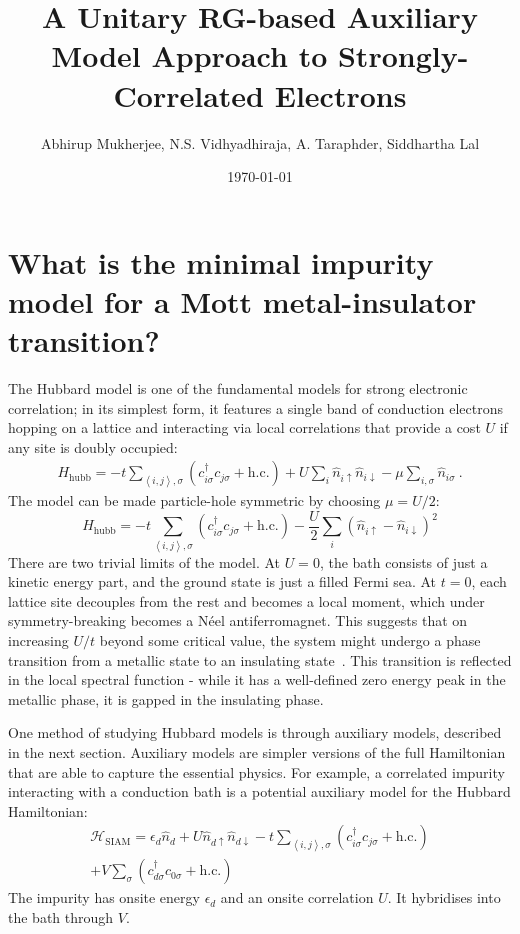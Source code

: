 \documentclass[reprint,hidelinks]{revtex4-2}
\begin{document}
\title{\bf A Unitary RG-based Auxiliary Model Approach to Strongly-Correlated Electrons}
\author{Abhirup Mukherjee, N.S. Vidhyadhiraja, A. Taraphder, Siddhartha Lal}
\date{\today}
\maketitle
\tableofcontents

\section{What is the minimal impurity model for a Mott metal-insulator transition?}
The Hubbard model is one of the fundamental models for strong electronic correlation; in its simplest form, it features a single band of conduction electrons hopping on a lattice and interacting via local correlations that provide a cost \(U\) if any site is doubly occupied:
\begin{equation}\begin{aligned}
	H_\text{hubb} = -t\sum_{\left<i,j \right>,\sigma}\left(c^\dagger_{i\sigma}c_{j\sigma}+\text{h.c.}\right) + U\sum_i \hat n_{i \uparrow} \hat n_{i \downarrow} - \mu \sum_{i,\sigma}\hat n_{i\sigma}~.
\end{aligned}\end{equation}
The model can be made particle-hole symmetric by choosing \(\mu = U/2\):
\[H_\text{hubb} = -t\sum_{\left<i,j \right>,\sigma}\left(c^\dagger_{i\sigma}c_{j\sigma}+\text{h.c.}\right) - \frac{U}{2}\sum_i \left(\hat n_{i \uparrow} - \hat n_{i \downarrow}\right)^2\]
There are two trivial limits of the model. At \(U=0\), the bath consists of just a kinetic energy part, and the ground state is just a filled Fermi sea. At \(t=0\), each lattice site decouples from the rest and becomes a local moment, which under symmetry-breaking becomes a Néel antiferromagnet. This suggests that on increasing \(U/t\) beyond some critical value, the system might undergo a phase transition from a metallic state to an insulating state~\cite{Mott_1949}. This transition is reflected in the local spectral function - while it has a well-defined zero energy peak in the metallic phase, it is gapped in the insulating phase.

One method of studying Hubbard models is through auxiliary models, described in the next section. Auxiliary models are simpler versions of the full Hamiltonian that are able to capture the essential physics. For example, a correlated impurity interacting with a conduction bath is a potential auxiliary model for the Hubbard Hamiltonian:
\begin{equation}\begin{aligned}
\label{clus_bath_siam}
\mathcal{H}_\text{SIAM} = \epsilon_d \hat n_d + U \hat n_{d \uparrow} \hat n_{d \downarrow} - t\sum_{\left<i,j \right>, \sigma}\left(c^\dagger_{i\sigma}c_{j\sigma} + \text{h.c.}\right) \\
+ V\sum_\sigma \left( c^\dagger_{d\sigma}c_{0\sigma} + \text{h.c.}\right) 
\end{aligned}\end{equation}
The impurity has onsite energy \(\epsilon_d\) and an onsite correlation \(U\). It hybridises into the bath through \(V\).
\end{document}
